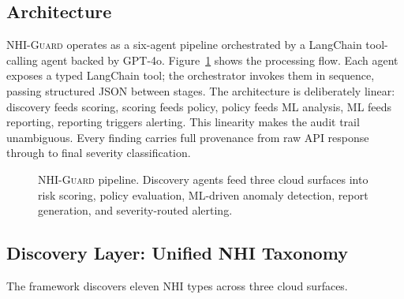 \documentclass[journal]{IEEEtran}
\begin{document}
\subsection{Architecture}

\textsc{NHI-Guard} operates as a six-agent pipeline orchestrated by a LangChain tool-calling agent backed by GPT-4o. Figure~\ref{fig:arch} shows the processing flow. Each agent exposes a typed LangChain tool; the orchestrator invokes them in sequence, passing structured JSON between stages. The architecture is deliberately linear: discovery feeds scoring, scoring feeds policy, policy feeds ML analysis, ML feeds reporting, reporting triggers alerting. This linearity makes the audit trail unambiguous. Every finding carries full provenance from raw API response through to final severity classification.

\begin{figure}[t]
  \centering
  \caption{\textsc{NHI-Guard} pipeline. Discovery agents feed three cloud surfaces into risk scoring, policy evaluation, ML-driven anomaly detection, report generation, and severity-routed alerting.}
  \label{fig:arch}
\end{figure}

\subsection{Discovery Layer: Unified NHI Taxonomy}

The framework discovers eleven NHI types across three cloud surfaces.
\end{document}
